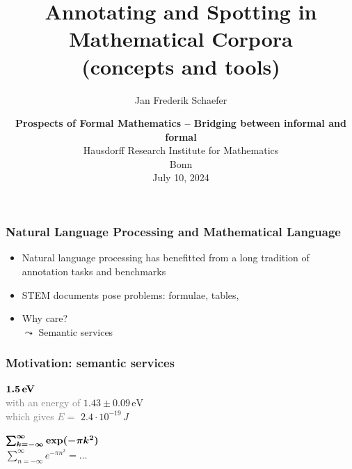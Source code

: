 \documentclass[aspectratio=169]{beamer}
\title{Annotating and Spotting in Mathematical Corpora\\(concepts and tools)}
\author{Jan Frederik Schaefer}
\institute{FAU Erlangen-N\"urnberg}
\date{\textbf{Prospects of Formal Mathematics -- Bridging between informal and formal}\\Hausdorff Research Institute for Mathematics\\Bonn\\July 10, 2024}
\begin{document}
\frame\titlepage

\begin{frame}
    \frametitle{Natural Language Processing and Mathematical Language}
    \begin{itemize}
        \item Natural language processing has benefitted from a long tradition of annotation tasks and benchmarks
        \item STEM documents pose problems:
            formulae, tables, \textellipsis
        \item Why care?\\
            $\leadsto$ Semantic services
    \end{itemize}
\end{frame}


\begin{frame}
    \frametitle{Motivation: semantic services}
    \faSearch\;\; $\bm{1.5\,\text{\bf eV}}$
    \\[1em]
        \quad\quad\faExternalLink\;\; \textcolor{gray}{with an energy of} $1.43 \pm 0.09\,\text{eV}$\\[1em]
        \quad\quad\faExternalLink\;\; \textcolor{gray}{which gives $E=$} $2.4 \cdot 10^{-19}\,J$

    \vspace{3em}
    \faSearch\;\; $\bm{\sum_{k=-\infty}^\infty \text{\bf exp}(-\pi k^2)}$
    \\[1em]
        \quad\quad\faExternalLink\;\; $\sum_{n=-\infty}^\infty e^{-\pi n^2} = \ldots$
\end{frame}
\end{document}
